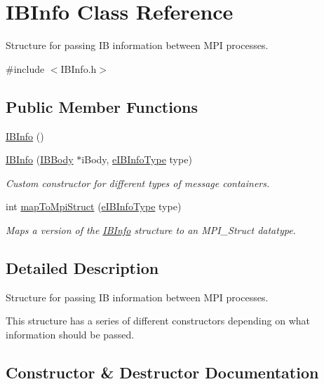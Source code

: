 \hypertarget{class_i_b_info}{}\section{I\+B\+Info Class Reference}
\label{class_i_b_info}


Structure for passing IB information between M\+PI processes.  




{\ttfamily \#include $<$I\+B\+Info.\+h$>$}

\subsection*{Public Member Functions}
\begin{DoxyCompactItemize}
\item 
\hyperlink{class_i_b_info_ab1b7ff9861d5920fdb50cbcc7c8154a7}{I\+B\+Info} ()
\item 
\hyperlink{class_i_b_info_ab0c04478c166732f951433f0f654028b}{I\+B\+Info} (\hyperlink{class_i_b_body}{I\+B\+Body} $\ast$i\+Body, \hyperlink{_i_b_info_8h_abebe7da22c3d9c15fff1438f5a452002}{e\+I\+B\+Info\+Type} type)
\begin{DoxyCompactList}\small\item\em Custom constructor for different types of message containers. \end{DoxyCompactList}\item 
int \hyperlink{class_i_b_info_a8a69bdc7f68d65f04bc1d943c1bc802d}{map\+To\+Mpi\+Struct} (\hyperlink{_i_b_info_8h_abebe7da22c3d9c15fff1438f5a452002}{e\+I\+B\+Info\+Type} type)
\begin{DoxyCompactList}\small\item\em Maps a version of the \hyperlink{class_i_b_info}{I\+B\+Info} structure to an M\+P\+I\+\_\+\+Struct datatype. \end{DoxyCompactList}\end{DoxyCompactItemize}


\subsection{Detailed Description}
Structure for passing IB information between M\+PI processes. 

This structure has a series of different constructors depending on what information should be passed. 

\subsection{Constructor \& Destructor Documentation}
